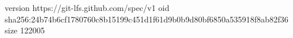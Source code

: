 version https://git-lfs.github.com/spec/v1
oid sha256:24b74b6cf1780760c8b15199c451d1f61d9b0b9d80bf6850a535918f8ab82f36
size 122005
